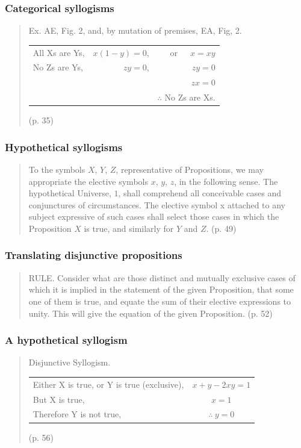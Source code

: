 \documentclass[compress,12pt]{beamer}
\begin{document}
\begin{frame}
    \frametitle{Categorical syllogisms}
    \begin{quote}
        Ex. AE, Fig. 2, and, by mutation of premises, EA, Fig, 2.
        \begin{center}
            \begin{tabular}{l r r}
                All Xs are Ys, & $x(1-y)=0$, & or\ \ \ $x=xy$ \\
                No Zs are Ys, & $zy=0$, & $zy=0$ \\
                & & $zx=0$ \\
                & & $\therefore$ No Zs are Xs.    
            \end{tabular}
        \end{center}
        (p. 35)
    \end{quote}
\end{frame}

\begin{frame}
    \frametitle{Hypothetical syllogisms}
    \begin{quote}
        To the symbols $X$, $Y$, $Z$, representative of Propositions, we
        may appropriate the elective symbols $x$, $y$, $z$, in the following
        sense.
        The hypothetical Universe, $1$, shall comprehend all conceivable cases and conjunctures of circumstances.
        The elective symbol x attached to any subject expressive of
        such cases shall select those cases in which the Proposition $X$
        is true, and similarly for $Y$ and $Z$. (p. 49)
    \end{quote}
\end{frame}

\begin{frame}
    \frametitle{Translating disjunctive propositions}
    \begin{quote}
        RULE. \textup{Consider what are those distinct and mutually exclusive
        cases of which it is implied in the statement of the given Proposition, that some one of them is true, and equate the sum of their
        elective expressions to unity. This will give the equation of the
        given Proposition.}
        (p. 52)
    \end{quote}
\end{frame}

\begin{frame}
    \frametitle{A hypothetical syllogism}
    \begin{quote}
        Disjunctive Syllogism.

        \begin{tabular}{l c}
            Either X is true, or Y is true (exclusive), & $x+y-2xy=1$\\
            But X is true, & $x=1$ \\
            Therefore Y is not true, & $\therefore\ y=0$           
        \end{tabular}
        (p. 56)
    \end{quote}
\end{frame}
\end{document}
